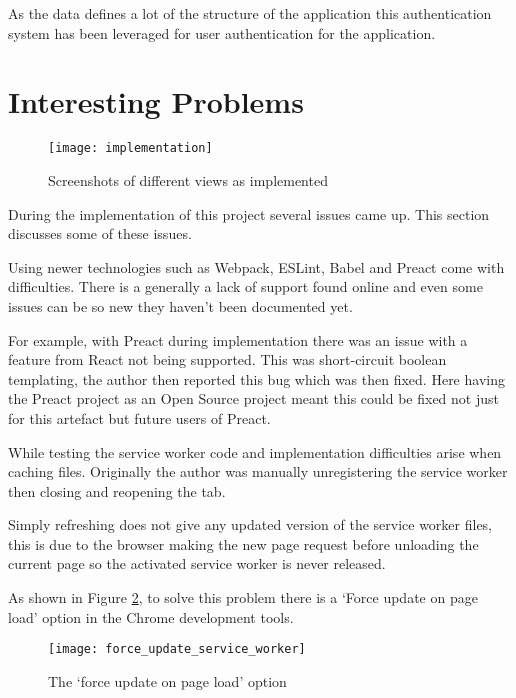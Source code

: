 As the data defines a lot of the structure of the application this authentication system has been leveraged for user authentication for the application.

\section{Interesting Problems} \label{s-i--interesting-problems}

\begin{figure}[H]
  \centering
    \texttt{[image: implementation]}
  \caption{Screenshots of different views as implemented}
  \label{figure-implementation-screenshots}
\end{figure}

During the implementation of this project several issues came up. This section discusses some of these issues.

Using newer technologies such as Webpack, ESLint, Babel and Preact come with difficulties. There is a generally a lack of support found online and even some issues can be so new they haven't been documented yet.

For example, with Preact during implementation there was an issue with a feature from React not being supported. This was short-circuit boolean templating, the author then reported this bug which was then fixed. Here having the Preact project as an Open Source project meant this could be fixed not just for this artefact but future users of Preact.

While testing the service worker code and implementation difficulties arise when caching files. Originally the author was manually unregistering the service worker then closing and reopening the tab.

Simply refreshing does not give any updated version of the service worker files, this is due to the browser making the new page request before unloading the current page so the activated service worker is never released. \cite{refresh_sw}

As shown in Figure \ref{figure-force-update-service-worker}, to solve this problem there is a `Force update on page load' option in the Chrome development tools.

\begin{figure}[H]
  \centering
    \texttt{[image: force\_update\_service\_worker]}
  \caption{The `force update on page load' option}
  \label{figure-force-update-service-worker}
\end{figure}

